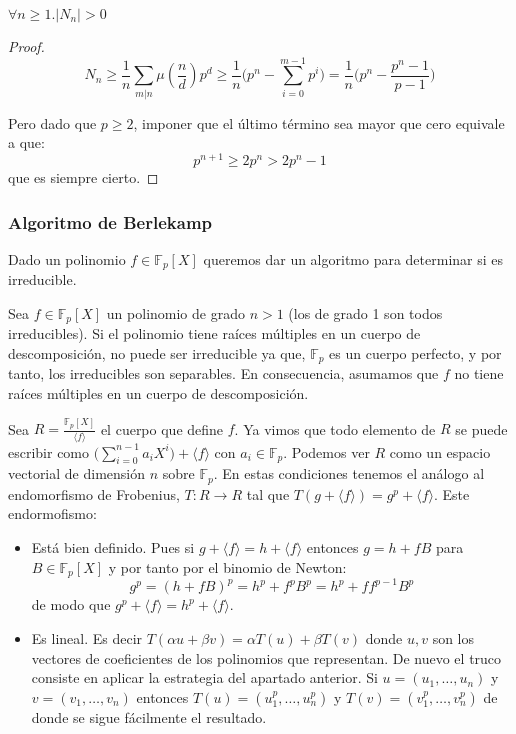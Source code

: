 \begin{corollary}
$\forall n \ge 1. |N_n| > 0$
\end{corollary}
\begin{proof}
$$N_n \ge \frac{1}{n} \sum_{m|n} \mu(\frac{n}{d}) p^d \ge \frac{1}{n} \Big(p^n - \sum_{i = 0}^{m-1} p^i \Big) = \frac{1}{n} \Big(p^n - \frac{p^n - 1}{p - 1} \Big)$$

Pero dado que $p \ge 2$, imponer que el último término sea mayor que cero equivale a que: $$p^{n+1} \ge 2p^n > 2p^n - 1$$ que es siempre cierto. 
\end{proof}

\subsubsection{Algoritmo de Berlekamp}

Dado un polinomio $f \in \mathbb{F}_p[X]$ queremos dar un algoritmo para determinar si es irreducible. 

Sea $f \in \mathbb{F}_p[X]$ un polinomio de grado $n > 1$ (los de grado 1 son todos irreducibles). Si el polinomio tiene raíces múltiples en un cuerpo de descomposición, no puede ser irreducible ya que, $\mathbb{F}_p$ es un cuerpo perfecto, y por tanto, los irreducibles son separables. En consecuencia, asumamos que $f$ no tiene raíces múltiples en un cuerpo de descomposición.

Sea $R = \frac{\mathbb{F}_p[X]}{\langle f \rangle}$ el cuerpo que define $f$. Ya vimos que todo elemento de $R$ se puede escribir como $\Big(\sum_{i = 0}^{n-1} a_iX^i \Big) + \langle f \rangle$ con $a_i \in \mathbb{F}_p$. Podemos ver $R$ como un espacio vectorial de dimensión $n$ sobre $\mathbb{F}_p$. En estas condiciones tenemos el análogo al endomorfismo de Frobenius, $T:R \to R$ tal que $T(g + \langle f \rangle) = g^p + \langle f \rangle$. Este endormofismo:

\begin{itemize}
\item Está bien definido. Pues si $g + \langle f \rangle = h + \langle f \rangle$ entonces $g = h + fB$ para $B \in \mathbb{F}_p[X]$ y por tanto por el binomio de Newton: $$g^p = (h+fB)^p = h^p + f^pB^p = h^p + f f^{p-1}B^p$$ de modo que $g^p + \langle f \rangle = h^p + \langle f \rangle$. 

\item Es lineal. Es decir $T(\alpha u + \beta v) = \alpha T(u) + \beta T(v)$ donde $u,v$ son los vectores de coeficientes de los polinomios que representan. De nuevo el truco consiste en aplicar la estrategia del apartado anterior. Si $u = (u_1, \ldots, u_n)$ y $v = (v_1,\ldots,v_n)$ entonces $T(u) = (u_1^p, \ldots, u_n^p)$ y $T(v) = (v_1^p,\ldots,v_n^p)$ de donde se sigue fácilmente el resultado. 
\end{itemize}

